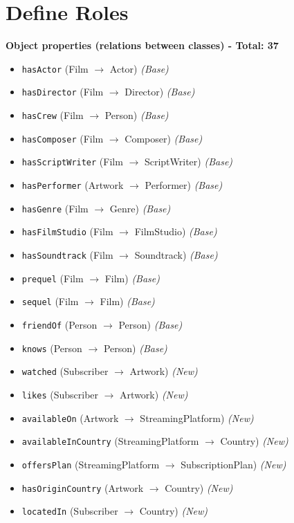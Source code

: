 \chapter{Define Roles}

\textbf{Object properties (relations between classes) - Total: 37}
\begin{itemize}
    \item \texttt{hasActor} (Film $\rightarrow$ Actor) \textit{(Base)}
    \item \texttt{hasDirector} (Film $\rightarrow$ Director) \textit{(Base)}
    \item \texttt{hasCrew} (Film $\rightarrow$ Person) \textit{(Base)}
    \item \texttt{hasComposer} (Film $\rightarrow$ Composer) \textit{(Base)}
    \item \texttt{hasScriptWriter} (Film $\rightarrow$ ScriptWriter) \textit{(Base)}
    \item \texttt{hasPerformer} (Artwork $\rightarrow$ Performer) \textit{(Base)}
    \item \texttt{hasGenre} (Film $\rightarrow$ Genre) \textit{(Base)}
    \item \texttt{hasFilmStudio} (Film $\rightarrow$ FilmStudio) \textit{(Base)}
    \item \texttt{hasSoundtrack} (Film $\rightarrow$ Soundtrack) \textit{(Base)}
    \item \texttt{prequel} (Film $\rightarrow$ Film) \textit{(Base)}
    \item \texttt{sequel} (Film $\rightarrow$ Film) \textit{(Base)}
    \item \texttt{friendOf} (Person $\rightarrow$ Person) \textit{(Base)}
    \item \texttt{knows} (Person $\rightarrow$ Person) \textit{(Base)}
    \item \texttt{watched} (Subscriber $\rightarrow$ Artwork) \textit{(New)}
    \item \texttt{likes} (Subscriber $\rightarrow$ Artwork) \textit{(New)}
    \item \texttt{availableOn} (Artwork $\rightarrow$ StreamingPlatform) \textit{(New)}
    \item \texttt{availableInCountry} (StreamingPlatform $\rightarrow$ Country) \textit{(New)}
    \item \texttt{offersPlan} (StreamingPlatform $\rightarrow$ SubscriptionPlan) \textit{(New)}
    \item \texttt{hasOriginCountry} (Artwork $\rightarrow$ Country) \textit{(New)}
    \item \texttt{locatedIn} (Subscriber $\rightarrow$ Country) \textit{(New)}

\end{itemize}
